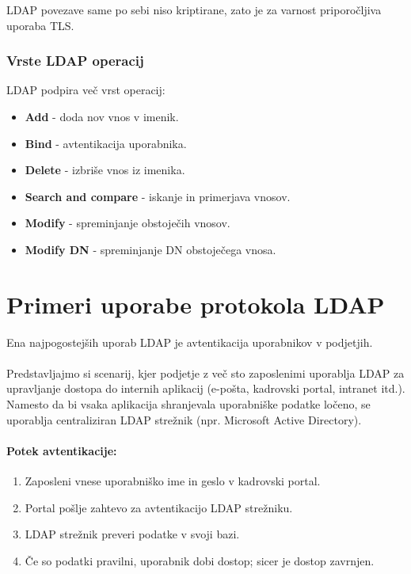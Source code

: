 \documentclass[a4paper,12pt]{article}
\begin{document}
LDAP povezave same po sebi niso kriptirane, zato je za varnost priporočljiva uporaba TLS.

\subsubsection{Vrste LDAP operacij}
LDAP podpira več vrst operacij:
\begin{itemize}
    \item \textbf{Add} - doda nov vnos v imenik.
    \item \textbf{Bind} - avtentikacija uporabnika.
    \item \textbf{Delete} - izbriše vnos iz imenika.
    \item \textbf{Search and compare} - iskanje in primerjava vnosov.
    \item \textbf{Modify} - spreminjanje obstoječih vnosov.
    \item \textbf{Modify DN} - spreminjanje DN obstoječega vnosa.
\end{itemize}

\section{Primeri uporabe protokola LDAP}

Ena najpogostejših uporab LDAP je avtentikacija uporabnikov v podjetjih.

\paragraph{}
Predstavljajmo si scenarij, kjer podjetje z več sto zaposlenimi uporablja LDAP za upravljanje dostopa do internih aplikacij (e-pošta, kadrovski portal, intranet itd.). Namesto da bi vsaka aplikacija shranjevala uporabniške podatke ločeno, se uporablja centraliziran LDAP strežnik (npr. Microsoft Active Directory).

\paragraph{Potek avtentikacije:}
\begin{enumerate}
    \item Zaposleni vnese uporabniško ime in geslo v kadrovski portal.
    \item Portal pošlje zahtevo za avtentikacijo LDAP strežniku.
    \item LDAP strežnik preveri podatke v svoji bazi.
    \item Če so podatki pravilni, uporabnik dobi dostop; sicer je dostop zavrnjen.
\end{enumerate}
\end{document}
